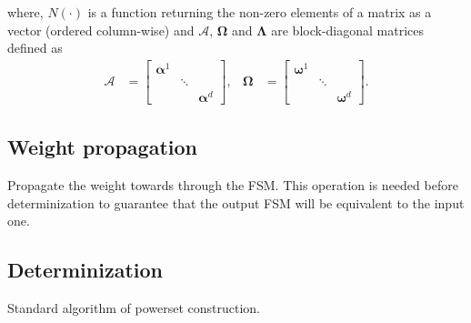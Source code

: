 where, $N(\cdot)$ is a function returning the non-zero elements of a matrix
as a vector (ordered column-wise) and $\boldsymbol{\mathcal{A}}$,
$\boldsymbol{\Omega}$ and $\boldsymbol{\Lambda}$ are block-diagonal
matrices defined as
\begin{align}
    \boldsymbol{\mathcal{A}} &= \begin{bmatrix}
        \boldsymbol{\alpha}^1 & & \\
            & \ddots & \\
            & & \boldsymbol{\alpha}^d
        \end{bmatrix}, &
    \boldsymbol{\Omega} &= \begin{bmatrix}
        \boldsymbol{\omega}^1 & & \\
            & \ddots & \\
            & & \boldsymbol{\omega}^d
        \end{bmatrix}.
\end{align}

\subsection{Weight propagation}

Propagate the weight towards through the FSM. This operation is needed
before determinization to guarantee that the output FSM will be
equivalent to the input one.

\subsection{Determinization}

Standard algorithm of powerset construction.

